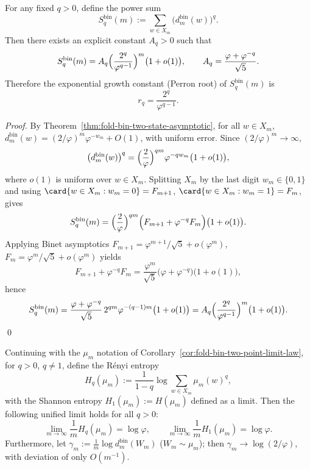 \begin{proposition}\label{prop:fold-bin-power-sum-asymptotic}
For any fixed \(q>0\), define the power sum
\[
S_q^{\mathrm{bin}}(m):=\sum_{w\in X_m}\bigl(d^{\mathrm{bin}}_m(w)\bigr)^q.
\]
Then there exists an explicit constant \(A_q>0\) such that
\[
S_q^{\mathrm{bin}}(m)=A_q\Bigl(\frac{2^q}{\varphi^{q-1}}\Bigr)^{m}\bigl(1+o(1)\bigr),
\qquad
A_q=\frac{\varphi+\varphi^{-q}}{\sqrt5}.
\]
Therefore the exponential growth constant (Perron root) of \(S_q^{\mathrm{bin}}(m)\) is
\[
r_q=\frac{2^q}{\varphi^{q-1}}.
\]
\end{proposition}

\begin{proof}
By Theorem~\ref{thm:fold-bin-two-state-asymptotic}, for all \(w\in X_m\),
\(
d^{\mathrm{bin}}_m(w)=(2/\varphi)^m\varphi^{-w_m}+O(1)
\),
with uniform error.
Since \((2/\varphi)^m\to\infty\),
\[
\bigl(d^{\mathrm{bin}}_m(w)\bigr)^q
=\Bigl(\frac{2}{\varphi}\Bigr)^{qm}\varphi^{-q w_m}\bigl(1+o(1)\bigr),
\]
where \(o(1)\) is uniform over \(w\in X_m\).
Splitting \(X_m\) by the last digit \(w_m\in\{0,1\}\) and using
\(
\card\{w\in X_m:w_m=0\}=F_{m+1}
\), \(
\card\{w\in X_m:w_m=1\}=F_{m}
\), gives
\[
S_q^{\mathrm{bin}}(m)
=\Bigl(\frac{2}{\varphi}\Bigr)^{qm}\Bigl(F_{m+1}+\varphi^{-q}F_m\Bigr)\bigl(1+o(1)\bigr).
\]
Applying Binet asymptotics \(F_{m+1}=\varphi^{m+1}/\sqrt5+o(\varphi^m)\), \(F_m=\varphi^m/\sqrt5+o(\varphi^m)\) yields
\[
F_{m+1}+\varphi^{-q}F_m
=\frac{\varphi^m}{\sqrt5}\bigl(\varphi+\varphi^{-q}\bigr)\bigl(1+o(1)\bigr),
\]
hence
\[
S_q^{\mathrm{bin}}(m)
=\frac{\varphi+\varphi^{-q}}{\sqrt5}\,
2^{qm}\varphi^{-(q-1)m}\bigl(1+o(1)\bigr)
=A_q\Bigl(\frac{2^q}{\varphi^{q-1}}\Bigr)^m\bigl(1+o(1)\bigr).
\]
\qed
\end{proof}

\begin{theorem}\label{thm:fold-bin-renyi-rate-collapse}
Continuing with the \(\mu_m\) notation of Corollary~\ref{cor:fold-bin-two-point-limit-law},
for \(q>0\), \(q\neq 1\), define the R\'enyi entropy
\[
H_q(\mu_m):=\frac{1}{1-q}\log\sum_{w\in X_m}\mu_m(w)^q,
\]
with the Shannon entropy \(H_1(\mu_m):=H(\mu_m)\) defined as a limit.
Then the following unified limit holds for all \(q>0\):
\[
\lim_{m\to\infty}\frac{1}{m}H_q(\mu_m)=\log\varphi,
\qquad
\lim_{m\to\infty}\frac{1}{m}H_1(\mu_m)=\log\varphi.
\]
Furthermore, let
\(
\gamma_m:=\frac{1}{m}\log d^{\mathrm{bin}}_m(W_m)
\) (\(W_m\sim\mu_m\));
then \(\gamma_m\to\log(2/\varphi)\), with deviation of only \(O(m^{-1})\).
\end{theorem}

